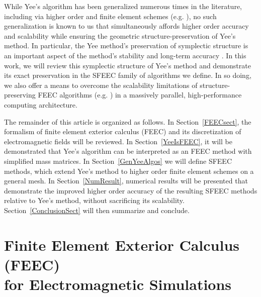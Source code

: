 \documentclass[final,twocolumn]{elsarticle}
\begin{document}
While Yee's algorithm has been generalized numerous times in the literature, including via higher order and finite element schemes (e.g. \cite{stern_geometric_2009,bo_he_sparse_2006,kim_parallel_2011,teixeira_differential_2013,hano_generalized_1997,cole_high-accuracy_1997,chen_generalization_2006,teixeira_time-domain_2008}), no such generalization is known to us that simultaneously affords higher order accuracy and scalability while ensuring the geometric structure-preservation of Yee's method. In particular, the Yee method's preservation of symplectic structure is an important aspect of the method's stability and long-term accuracy \cite{stern_geometric_2015}. In this work, we will review this symplectic structure of Yee's method and demonstrate its exact preservation in the SFEEC family of algorithms we define. In so doing, we also offer a means to overcome the scalability limitations of structure-preserving FEEC algorithms (e.g. \cite{kraus_gempic:_2017,glasser_gauge-compatible_2022}) in a massively parallel, high-performance computing architecture.

The remainder of this article is organized as follows. In Section~\ref{FEECsect}, the formalism of finite element exterior calculus (FEEC) \cite{arnold_finite_2006,arnold_finite_2010} and its discretization of electromagnetic fields will be reviewed. In Section~\ref{YeeIsFEEC}, it will be demonstrated that Yee's algorithm can be interpreted as an FEEC method with simplified mass matrices. In Section~\ref{GenYeeAlgos} we will define SFEEC methods, which extend Yee's method to higher order finite element schemes on a general mesh. In Section~\ref{NumResult}, numerical results will be presented that demonstrate the improved higher order accuracy of the resulting SFEEC methods relative to Yee's method, without sacrificing its scalability. Section~\ref{ConclusionSect} will then summarize and conclude.

\section{Finite Element Exterior Calculus (FEEC)\\for Electromagnetic Simulations\label{FEECsect}}
\end{document}
